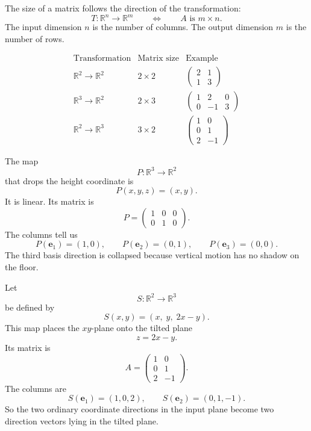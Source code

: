 The size of a matrix follows the direction of the transformation:
\[
    T:\mathbb R^n\to\mathbb R^m
    \qquad\Longleftrightarrow\qquad
    A\text{ is }m\times n.
\]
The input dimension \(n\) is the number of columns.  The output dimension \(m\) is the
number of rows.

\[
\begin{array}{c|c|c}
\text{Transformation} & \text{Matrix size} & \text{Example} \\ \hline
\mathbb R^2\to\mathbb R^2 & 2\times2
&
\begin{pmatrix}2&1\\1&3\end{pmatrix}
\\[1.2em]
\mathbb R^3\to\mathbb R^2 & 2\times3
&
\begin{pmatrix}1&2&0\\0&-1&3\end{pmatrix}
\\[1.2em]
\mathbb R^2\to\mathbb R^3 & 3\times2
&
\begin{pmatrix}1&0\\0&1\\2&-1\end{pmatrix}
\end{array}
\]

\begin{example}[A projection]
The map
\[
    P:\mathbb R^3\to\mathbb R^2
\]
that drops the height coordinate is
\[
    P(x,y,z)=(x,y).
\]
It is linear.  Its matrix is
\[
    P=
    \begin{pmatrix}
        1&0&0\\
        0&1&0
    \end{pmatrix}.
\]
The columns tell us
\[
    P(\mathbf e_1)=(1,0),
    \qquad
    P(\mathbf e_2)=(0,1),
    \qquad
    P(\mathbf e_3)=(0,0).
\]
The third basis direction is collapsed because vertical motion has no shadow on the
floor.
\end{example}

\begin{example}
Let
\[
    S:\mathbb R^2\to\mathbb R^3
\]
be defined by
\[
    S(x,y)=(x,\;y,\;2x-y).
\]
This map places the \(xy\)-plane onto the tilted plane
\[
    z=2x-y.
\]
Its matrix is
\[
    A=
    \begin{pmatrix}
        1&0\\
        0&1\\
        2&-1
    \end{pmatrix}.
\]
The columns are
\[
    S(\mathbf e_1)=(1,0,2),
    \qquad
    S(\mathbf e_2)=(0,1,-1).
\]
So the two ordinary coordinate directions in the input plane become two direction
vectors lying in the tilted plane.
\end{example}

